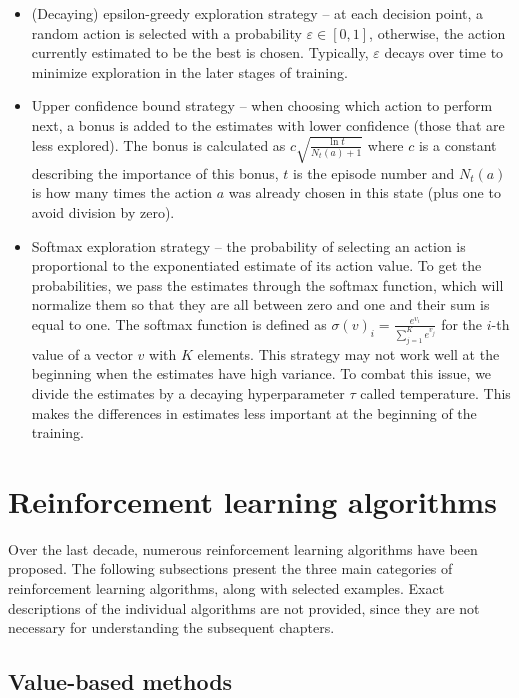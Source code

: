 \documentclass[
  digital,     %
  oneside,     %
  nosansbold,  %
  nocolorbold, %
  lof,         %
  lot,         %
]{fithesis4}
\begin{document}
\begin{itemize}
    \item (Decaying) epsilon-greedy exploration strategy -- at each decision point, a random action is selected with a probability $\varepsilon \in [0,1]$, otherwise, the action currently estimated to be the best is chosen. Typically, $\varepsilon$ decays over time to minimize exploration in the later stages of training.
    \item Upper confidence bound strategy -- when choosing which action to perform next, a bonus is added to the estimates with lower confidence (those that are less explored). The bonus is calculated as $c\sqrt{\frac{\ln{t}}{N_t(a)+1}}$ where $c$ is a constant describing the importance of this bonus, $t$ is the episode number and $N_t(a)$ is how many times the action $a$ was already chosen in this state (plus one to avoid division by zero).
    \item Softmax exploration strategy -- the probability of selecting an action is proportional to the exponentiated estimate of its action value. To get the probabilities, we pass the estimates through the softmax function, which will normalize them so that they are all between zero and one and their sum is equal to one. The softmax function is defined as $\sigma (v)_i = \frac{e^{v_i}}{\sum^{K}_{j=1}e^{v_j}}$ for the $i$-th value of a vector $v$ with $K$ elements. This strategy may not work well at the beginning when the estimates have high variance. To combat this issue, we divide the estimates by a decaying hyperparameter $\tau$ called temperature. This makes the differences in estimates less important at the beginning of the training.
\end{itemize}



\section{Reinforcement learning algorithms}
\label{sec:algos}

Over the last decade, numerous reinforcement learning algorithms have been proposed. The following subsections present the three main categories of reinforcement learning algorithms, along with selected examples. Exact descriptions of the individual algorithms are not provided, since they are not necessary for understanding the subsequent chapters.

\subsection{Value-based methods}
\label{subsec:value-based-methods}
\end{document}
